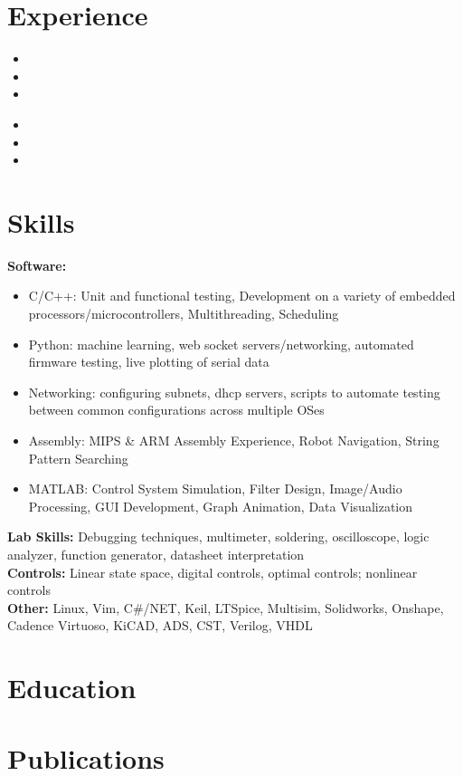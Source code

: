 \documentclass[11pt, a4paper]{article}
\begin{document}
\headerSimple

\section*{Experience}

\workplaceGTRI
\begin{itemize}
  \item \fpgaShort
  \item \fpgaMedium
  \item \fpgaLong
\end{itemize}

\workplaceBeam
\begin{itemize}
  \item \fpgaShort
  \item \fpgaMedium
  \item \fpgaLong
\end{itemize}

\section*{Skills}
{\scriptsize
  \textbf{Software:}
  \begin{itemize}[noitemsep] %
    \item C/C++: Unit and functional testing, Development on a variety of embedded processors/microcontrollers, Multithreading, Scheduling
    \item Python: machine learning, web socket servers/networking, automated firmware testing, live plotting of serial data
    \item Networking: configuring subnets, dhcp servers, scripts to automate testing between common configurations across multiple OSes
    \item Assembly: MIPS \& ARM Assembly Experience, Robot Navigation, String Pattern Searching
    \item MATLAB: Control System Simulation, Filter Design, Image/Audio Processing, GUI Development, Graph Animation, Data Visualization
  \end{itemize}
  \textbf{Lab Skills:} Debugging techniques, multimeter, soldering, oscilloscope, logic analyzer, function generator, datasheet interpretation\\
  \textbf{Controls:} Linear state space, digital controls, optimal controls; nonlinear controls\\
  \textbf{Other:} Linux, Vim, C\#/NET, Keil, LTSpice, Multisim, Solidworks, Onshape, Cadence Virtuoso, KiCAD, ADS, CST, Verilog, VHDL\par\noindent
}

\section*{Education}
{\scriptsize
  \educationSimple
}

\section*{Publications}
{\scriptsize
  \publications
}

\end{document}
